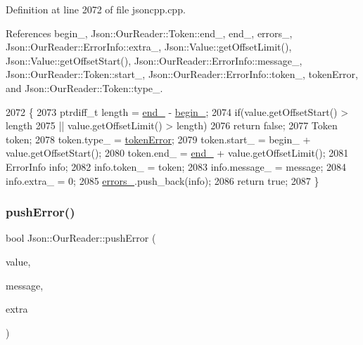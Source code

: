 Definition at line 2072 of file jsoncpp.\+cpp.



References begin\+\_\+, Json\+::\+Our\+Reader\+::\+Token\+::end\+\_\+, end\+\_\+, errors\+\_\+, Json\+::\+Our\+Reader\+::\+Error\+Info\+::extra\+\_\+, Json\+::\+Value\+::get\+Offset\+Limit(), Json\+::\+Value\+::get\+Offset\+Start(), Json\+::\+Our\+Reader\+::\+Error\+Info\+::message\+\_\+, Json\+::\+Our\+Reader\+::\+Token\+::start\+\_\+, Json\+::\+Our\+Reader\+::\+Error\+Info\+::token\+\_\+, token\+Error, and Json\+::\+Our\+Reader\+::\+Token\+::type\+\_\+.


\begin{DoxyCode}
2072                                                                            \{
2073   ptrdiff\_t length = \hyperlink{class_json_1_1_our_reader_ab1f69b0260c27a0d2d65dc56e42c8f9d}{end\_} - \hyperlink{class_json_1_1_our_reader_a9bda9d72335d52cd06e65f9eca3f70f5}{begin\_};
2074   \textcolor{keywordflow}{if}(value.getOffsetStart() > length
2075     || value.getOffsetLimit() > length)
2076     \textcolor{keywordflow}{return} \textcolor{keyword}{false};
2077   Token token;
2078   token.type\_ = \hyperlink{class_json_1_1_our_reader_a15116f7276ddf1e7a2cc3cbefa884dccad39f929b971de8dc55fe84a2d2e3465e}{tokenError};
2079   token.start\_ = begin\_ + value.getOffsetStart();
2080   token.end\_ = \hyperlink{class_json_1_1_our_reader_ab1f69b0260c27a0d2d65dc56e42c8f9d}{end\_} + value.getOffsetLimit();
2081   ErrorInfo info;
2082   info.token\_ = token;
2083   info.message\_ = message;
2084   info.extra\_ = 0;
2085   \hyperlink{class_json_1_1_our_reader_afb76b68ba1ab68fe09cf2838e3d4898d}{errors\_}.push\_back(info);
2086   \textcolor{keywordflow}{return} \textcolor{keyword}{true};
2087 \}
\end{DoxyCode}
\mbox{\label{class_json_1_1_our_reader_addccecfca74b79adaad6115ddd614477}} 
\subsubsection{\texorpdfstring{push\+Error()}{pushError()}\hspace{0.1cm}{\footnotesize\ttfamily [2/2]}}
{\footnotesize\ttfamily bool Json\+::\+Our\+Reader\+::push\+Error (\begin{DoxyParamCaption}\item[{const \hyperlink{class_json_1_1_value}{Value} \&}]{value,  }\item[{const \hyperlink{json_8h_a1e723f95759de062585bc4a8fd3fa4be}{J\+S\+O\+N\+C\+P\+P\+\_\+\+S\+T\+R\+I\+NG} \&}]{message,  }\item[{const \hyperlink{class_json_1_1_value}{Value} \&}]{extra }\end{DoxyParamCaption})}



